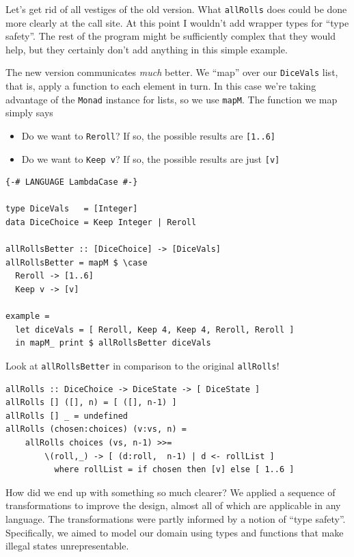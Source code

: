 Let's get rid of all vestiges of the old version. What \texttt{allRolls} does could be done more clearly at the call site. At this point I wouldn't add wrapper types for ``type safety''. The rest of the program might be sufficiently complex that they would help, but they certainly don't add anything in this simple example.

The new version communicates \textit{much} better. We ``map'' over our \texttt{DiceVals} list, that is, apply a function to each element in turn. In this case we're taking advantage of the \texttt{Monad} instance for lists, so we use \texttt{mapM}. The function we map simply says

\begin{itemize}
\item Do we want to \texttt{Reroll}? If so, the possible results are \texttt{[1..6]}  
\item Do we want to \texttt{Keep v}? If so, the possible results are just \texttt{[v]}
\end{itemize}


\begin{verbatim}
{-# LANGUAGE LambdaCase #-}

type DiceVals   = [Integer]
data DiceChoice = Keep Integer | Reroll

allRollsBetter :: [DiceChoice] -> [DiceVals]
allRollsBetter = mapM $ \case
  Reroll -> [1..6]
  Keep v -> [v]

example =
  let diceVals = [ Reroll, Keep 4, Keep 4, Reroll, Reroll ]
  in mapM_ print $ allRollsBetter diceVals
\end{verbatim}
Look at \texttt{allRollsBetter} in comparison to the original \texttt{allRolls}!

\begin{verbatim}
allRolls :: DiceChoice -> DiceState -> [ DiceState ]
allRolls [] ([], n) = [ ([], n-1) ]
allRolls [] _ = undefined
allRolls (chosen:choices) (v:vs, n) =
    allRolls choices (vs, n-1) >>=
        \(roll,_) -> [ (d:roll,  n-1) | d <- rollList ]
          where rollList = if chosen then [v] else [ 1..6 ]
\end{verbatim}
How did we end up with something so much clearer? We applied a sequence of transformations to improve the design, almost all of which are applicable in any language. The transformations were partly informed by a notion of ``type safety''. Specifically, we aimed to model our domain using types and functions that make illegal states unrepresentable.

